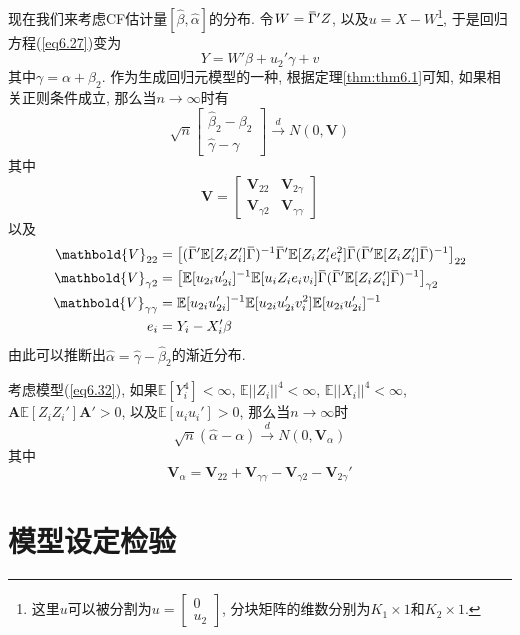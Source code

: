 \documentclass[cn, 12pt, math=mtpro2, bibstyle=apa, blue, twocol]{elegantbook}
\newcommand{\E}{\mathbb{E}}
\newcommand{\hb}{\hat{\beta}}
\newcommand{\V}{\mathbold{V}}
\newcommand{\A}{\mathbold{A}}
\newcommand{\overbar}[1]{\mkern 1.5mu\overline{\mkern-1.5mu#1\mkern-1.5mu}\mkern 1.5mu}
\begin{document}
现在我们来考虑CF估计量$[\hb,\hat{\alpha}]$的分布. 令$W=\overbar{\Gamma}'Z$, 以及$u=X-W$\footnote{这里$u$可以被分割为$u=\begin{bmatrix}
      0 \\
      u_2
    \end{bmatrix}$, 分块矩阵的维数分别为$K_1\times1$和$K_2\times1$.}, 于是回归方程(\ref{eq6.27})变为
\begin{equation}\label{eq6.32}
  Y=W'\beta+u_2'\gamma+v
\end{equation}
其中$\gamma=\alpha+\beta_2$. 作为生成回归元模型的一种, 根据定理\ref{thm:thm6.1}可知, 如果相关正则条件成立, 那么当$n\to\infty$时有
$$\sqrt{n}\begin{bmatrix}
            \hb_2-\beta_2 \\
            \hat{\gamma}-\gamma
          \end{bmatrix}\xrightarrow{d}N(0,\V)$$
其中
$$\V=\begin{bmatrix}
       \V_{22} & \V_{2\gamma} \\
       \V_{\gamma2} & \V_{\gamma\gamma}
     \end{bmatrix}$$
以及
\begin{align*}
\V_{22}&=\left[(\overbar{\Gamma}'\E[Z_iZ_i']\overbar{\Gamma})^{-1}\overbar{\Gamma}'\E[Z_iZ_i'e_i^2]\overbar{\Gamma}(\overbar{\Gamma}'\E[Z_iZ_i']\overbar{\Gamma})^{-1}\right]_{22} \\
\V_{\gamma 2}&=\left[\E[u_{2i}u_{2i}']^{-1}\E[u_iZ_ie_iv_i]\overbar{\Gamma}(\overbar{\Gamma}'\E[Z_iZ_i']\overbar{\Gamma})^{-1}\right]_{\gamma2} \\
\V_{\gamma\gamma}&=\E[u_{2i}u_{2i}']^{-1}\E[u_{2i}u_{2i}'v_i^2]\E[u_{2i}u_{2i}']^{-1} \\
e_i&=Y_i-X_i'\beta
\end{align*}
由此可以推断出$\hat{\alpha}=\hat{\gamma}-\hb_2$的渐近分布.
\begin{theorem}\label{thm:thm6.3}
  考虑模型(\ref{eq6.32}), 如果$\E[Y_i^4]<\infty$, $\E||Z_i||^4<\infty$, $\E||X_i||^4<\infty$, $\A\E[Z_iZ_i']\A'>0$, 以及$\E[u_iu_i']>0$, 那么当$n\to\infty$时
  $$\sqrt{n}(\hat{\alpha}-\alpha)\xrightarrow{d}N(0,\V_\alpha)$$
  其中
  $$\V_\alpha=\V_{22}+\V_{\gamma\gamma}-\V_{\gamma2}-\V_{2\gamma}'$$
\end{theorem}


\section{模型设定检验}
\end{document}
